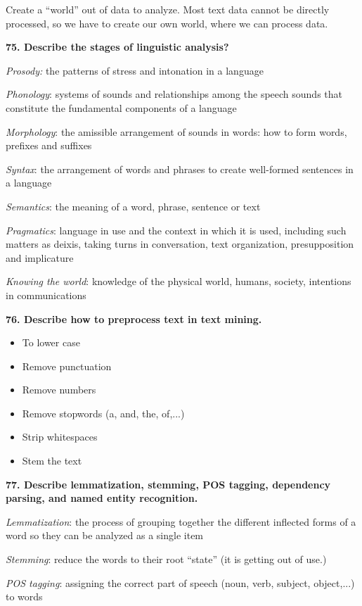 Create a ``world'' out of data to analyze. Most text data cannot be
directly processed, so we have to create our own world, where we can
process data.

\textbf{75. Describe the stages of linguistic analysis?}

\textit{Prosody:} the patterns of stress and intonation in a language

\textit{Phonology}: systems of sounds and relationships among the
speech sounds that constitute the fundamental components of a language

\textit{Morphology}: the amissible arrangement of sounds in words:
how to form words, prefixes and suffixes

\textit{Syntax}: the arrangement of words and phrases to create
well-formed sentences in a language

\textit{Semantics}: the meaning of a word, phrase, sentence or text

\textit{Pragmatics}: language in use and the context in which it is
used, including such matters as deixis, taking turns in conversation,
text organization, presupposition and implicature

\textit{Knowing the world}: knowledge of the physical world, humans,
society, intentions in communications

\textbf{76. Describe how to preprocess text in text mining.}

\begin{itemize}
\item To lower case
\item Remove punctuation
\item Remove numbers
\item Remove stopwords (a, and, the, of,...)
\item Strip whitespaces
\item Stem the text
\end{itemize}

\textbf{77. Describe lemmatization, stemming, POS tagging, dependency
parsing, and named entity recognition.}

\textit{Lemmatization}: the process of grouping together the
different inflected forms of a word so they can be analyzed as a single
item

\textit{Stemming}: reduce the words to their root ``state'' (it is
getting out of use.)

\textit{POS tagging}: assigning the correct part of speech (noun,
verb, subject, object,...) to words

